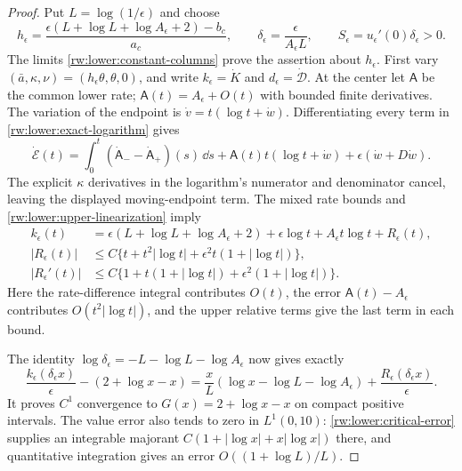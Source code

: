 \begin{proof}
Put $L=\log(1/\epsilon)$ and choose
\begin{equation}\label{rw:lower:direction-and-scale}
 h_\epsilon=
 \frac{\epsilon(L+\log L+\log A_\epsilon+2)-b_c}{a_c},\qquad
 \delta_\epsilon=\frac{\epsilon}{A_\epsilon L},\qquad
 S_\epsilon=u_\epsilon'(0)\delta_\epsilon>0.
\end{equation}
The limits \eqref{rw:lower:constant-columns} prove the assertion
about $h_\epsilon$. First vary
$(\bar a,\kappa,\nu)=(h_\epsilon\theta,\theta,0)$, and write
$k_\epsilon=\dot K$ and $d_\epsilon=\dot{\mathscr D}$.
At the center let $\mathsf A$ be the common lower rate;
$\mathsf A(t)=A_\epsilon+O(t)$ with bounded finite derivatives.
The variation of the endpoint is
$\dot v=t(\log t+\dot w)$. Differentiating every term in
\eqref{rw:lower:exact-logarithm} gives
\[
 \dot{\mathcal E}(t)
 =\int_0^t(\dot{\mathsf A}_--\dot{\mathsf A}_+)(s)\,\dd s
    +\mathsf A(t)t(\log t+\dot w)
    +\epsilon(\dot w+D\dot w).
\]
The explicit $\kappa$ derivatives in the logarithm's numerator and
denominator cancel, leaving the displayed moving-endpoint term.
The mixed rate bounds and \eqref{rw:lower:upper-linearization} imply
\begin{equation}\label{rw:lower:critical-error}
\begin{aligned}
 k_\epsilon(t)&=\epsilon(L+\log L+\log A_\epsilon+2)
                 +\epsilon\log t+A_\epsilon t\log t+R_\epsilon(t),\\
 |R_\epsilon(t)|&\le C\{t+t^2|\log t|
                  +\epsilon^2t(1+|\log t|)\},\\
 |R_\epsilon'(t)|&\le C\{1+t(1+|\log t|)
                  +\epsilon^2(1+|\log t|)\}.
\end{aligned}
\end{equation}
Here the rate-difference integral contributes $O(t)$, the error
$\mathsf A(t)-A_\epsilon$ contributes $O(t^2|\log t|)$, and
the upper relative terms give the last term in each bound.

The identity $\log\delta_\epsilon=-L-\log L-\log A_\epsilon$
now gives exactly
\[
 \frac{k_\epsilon(\delta_\epsilon x)}{\epsilon}
 -(2+\log x-x)
 =\frac{x}{L}(\log x-\log L-\log A_\epsilon)
       +\frac{R_\epsilon(\delta_\epsilon x)}{\epsilon}.
\]
It proves $C^1$ convergence to $G(x)=2+\log x-x$ on compact positive
intervals. The value error also tends to zero in $L^1(0,10)$:
\eqref{rw:lower:critical-error} supplies an integrable majorant
$C(1+|\log x|+x|\log x|)$ there, and quantitative integration gives
an error $O((1+\log L)/L)$.


\end{proof}
